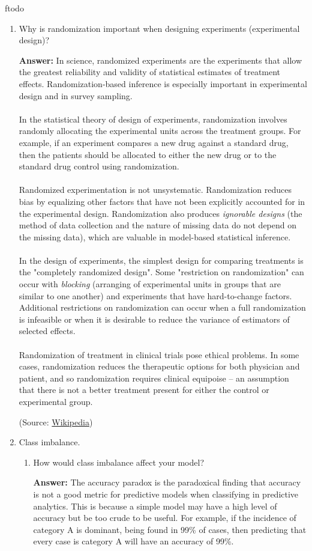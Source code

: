 ƒtodo\documentclass{article}
\newenvironment{QandA}{\begin{enumerate}[label=\arabic*.]}{\end{enumerate}}
\newenvironment{InnerQandA}{\begin{enumerate}[label=\roman*.]}{\end{enumerate}}
\newenvironment{answer}{\par\normalfont \textbf{Answer:}}{}
\begin{document}
\begin{QandA}
    \item Why is randomization important when designing experiments (experimental design)?
    \begin{answer}
        In science, randomized experiments are the experiments that allow the greatest reliability and validity of statistical estimates of treatment effects. Randomization-based inference is especially important in experimental design and in survey sampling. \\\\
        In the statistical theory of design of experiments, randomization involves randomly allocating the experimental units across the treatment groups. For example, if an experiment compares a new drug against a standard drug, then the patients should be allocated to either the new drug or to the standard drug control using randomization.\\\\
        Randomized experimentation is not unsystematic. Randomization reduces bias by equalizing other factors that have not been explicitly accounted for in the experimental design. Randomization also produces \textit{ignorable designs} (the method of data collection and the nature of missing data do not depend on the missing data), which are valuable in model-based statistical inference. \\\\
        In the design of experiments, the simplest design for comparing treatments is the "completely randomized design". Some "restriction on randomization" can occur with \textit{blocking} (arranging of experimental units in groups that are similar to one another) and experiments that have hard-to-change factors. Additional restrictions on randomization can occur when a full randomization is infeasible or when it is desirable to reduce the variance of estimators of selected effects. \\\\
        Randomization of treatment in clinical trials pose ethical problems. In some cases, randomization reduces the therapeutic options for both physician and patient, and so randomization requires clinical equipoise -- an assumption that there is not a better treatment present for either the control or experimental group.

        (Source: \href{https://en.wikipedia.org/wiki/Randomized_experiment}{Wikipedia})
    \end{answer}

    \item Class imbalance.
    \begin{InnerQandA}
        \item How would class imbalance affect your model?
        \begin{answer}
            The accuracy paradox is the paradoxical finding that accuracy is not a good metric for predictive models when classifying in predictive analytics. This is because a simple model may have a high level of accuracy but be too crude to be useful. For example, if the incidence of category A is dominant, being found in 99\% of cases, then predicting that every case is category A will have an accuracy of 99\%.


\end{answer}
\end{InnerQandA}
\end{QandA}
\end{document}
